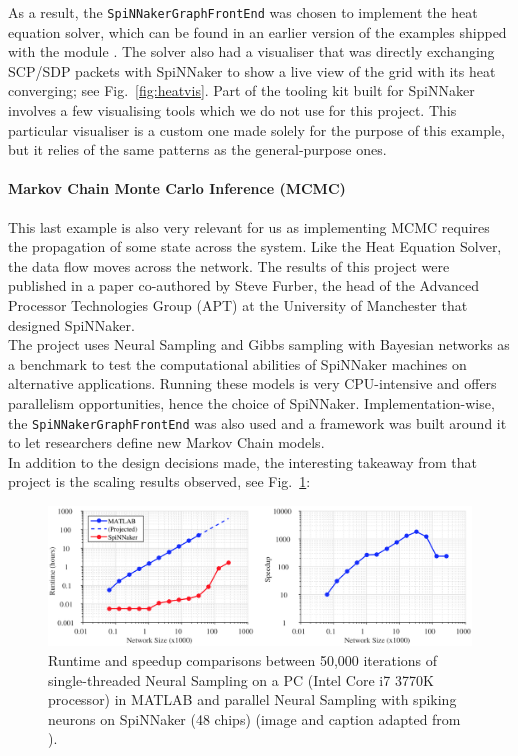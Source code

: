 As a result, the \texttt{SpiNNakerGraphFrontEnd} was chosen to implement the heat equation solver, which can be found in an earlier version of the examples shipped with the module \cite{gfeheat}. The solver also had a visualiser that was directly exchanging SCP/SDP packets with SpiNNaker to show a live view of the grid with its heat converging; see Fig.~\ref{fig:heatvis}. Part of the tooling kit built for SpiNNaker involves a few visualising tools which we do not use for this project. This particular visualiser is a custom one made solely for the purpose of this example, but it relies of the same patterns as the general-purpose ones. \\


\paragraph{Markov Chain Monte Carlo Inference (MCMC)} \label{sec:mcmc}

This last example is also very relevant for us as implementing MCMC requires the propagation of some state across the system. Like the Heat Equation Solver, the data flow moves across the network. The results of this project were published in a paper \cite{markov-on-spinn} co-authored by Steve Furber, the head of the Advanced Processor Technologies Group (APT) at the University of Manchester that designed SpiNNaker. \\

The project uses Neural Sampling and Gibbs sampling with Bayesian networks as a benchmark to test the computational abilities of SpiNNaker machines on alternative applications. Running these models is very CPU-intensive and offers parallelism opportunities, hence the choice of SpiNNaker. Implementation-wise, the \texttt{SpiNNakerGraphFrontEnd} was also used and a framework was built around it to let researchers define new Markov Chain models. \\

In addition to the design decisions made, the interesting takeaway from that project is the scaling results observed, see Fig.~\ref{fig:markov-spinn-results}:

\begin{figure}[hbtp]
\centering
\includegraphics[width = 1\hsize]{figures/markov-spinn-results.png}
\caption{Runtime and speedup comparisons between 50,000 iterations of single-threaded Neural Sampling on a PC (Intel Core i7 3770K processor) in MATLAB and parallel Neural Sampling with spiking neurons on SpiNNaker (48 chips) (image and caption adapted from \cite{markov-on-spinn}).}
\label{fig:markov-spinn-results}
\end{figure}


